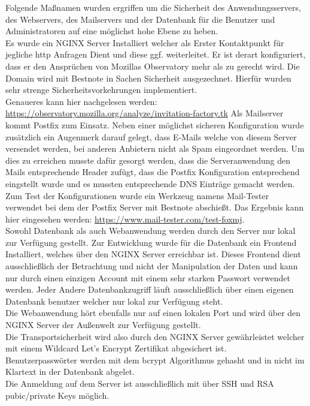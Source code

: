 \documentclass[landscape,a0paper,fontscale=0.285]{baposter} %
\begin{document}
\begin{poster}
{Folgende Maßnamen wurden ergriffen um die Sicherheit des Anwendungsservers, des Webservers, des Mailservers und der Datenbank für die Benutzer und Administratoren auf eine möglichst hohe Ebene zu heben.\\ 
Es wurde ein NGINX Server Installiert welcher als Erster Kontaktpunkt für jegliche http Anfragen Dient und diese ggf. weiterleitet. Er ist derart konfiguriert, dass er den Ansprüchen von Mozillas Observatory mehr als zu gerecht wird. Die Domain wird mit Bestnote in Sachen Sicherheit ausgezechnet. Hierfür wurden sehr strenge Sicherheitsvorkehrungen implementiert.\\ Genaueres kann hier nachgelesen werden: \url{https://observatory.mozilla.org/analyze/invitation-factory.tk}
Als Mailserver kommt Postfix zum Einsatz. Neben einer möglichst sicheren Konfiguration wurde zusätzlich ein Augenmerk darauf gelegt, dass E-Mails welche von diesem Server versendet werden, bei anderen Anbietern nicht als Spam eingeordnet werden. Um dies zu erreichen musste dafür gesorgt werden, dass die Serveranwendung den Mails entsprechende Header zufügt, dass die Postfix Konfiguration entsprechend eingstellt wurde und es mussten entsprechende DNS Einträge gemacht werden. Zum Test der Konfigurationen wurde ein Werkzeug namens Mail-Tester verwendet bei dem der Postfix Server mit Bestnote abschießt. Das Ergebnis kann hier eingesehen werden: \url{https://www.mail-tester.com/test-foxmj}.\\
Sowohl Datenbank als auch Webanwendung werden durch den Server nur lokal zur Verfügung gestellt. Zur Entwicklung wurde für die Datenbank ein Frontend Installiert, welches über den NGINX Server erreichbar ist. Dieses Frontend dient ausschließlich der Betrachtung und nicht der Manipulation der Daten und kann nur durch einen einzigen Account mit einem sehr starken Passwort verwendet werden. Jeder Andere Datenbankzugriff läuft ausschließlich über einen eigenen Datenbank benutzer welcher nur lokal zur Verfügung steht.\\
Die Webanwendung hört ebenfalls nur auf einen lokalen Port und wird über den NGINX Server der Außenwelt zur Verfügung gestellt.\\
Die Transportsicherheit wird also durch den NGINX Server gewährleistet welcher mit einem Wildcard Let's Encrypt Zertifikat abgesichert ist.\\
Benutzerpasswörter werden mit dem bcrypt Algorithmus gehasht und in nicht im Klartext in der Datenbank abgelet.\\
Die Anmeldung auf dem Server ist ausschließlich mit über SSH und RSA pubic/private Keys möglich. 


}
\end{poster}
\end{document}
